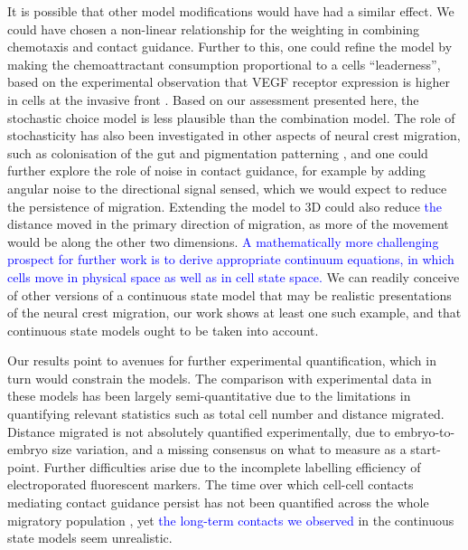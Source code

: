 \documentclass[review]{elsarticle}
\newcommand\hl[1]{{\textcolor{blue}{#1}}}
\begin{document}

It is possible that other model modifications would have had a similar effect. We could have chosen a non-linear relationship for the weighting in combining chemotaxis and contact guidance. Further to this, one could refine the model by making the chemoattractant consumption proportional to a cells ``leaderness'', based on the experimental observation that VEGF receptor expression is higher in cells at the invasive front \cite{McLennan2015,Morrison2017}. Based on our assessment presented here, the stochastic choice model is less plausible than the combination model. The role of stochasticity has also been investigated in other aspects of neural crest migration, such as colonisation of the gut \cite{Binder2015,Smadbeck2015,Zhang2018} and pigmentation patterning \cite{Mort2016}, and one could further explore the role of noise in contact guidance, for example by adding angular noise to the directional signal sensed, which we would expect to reduce the persistence of migration. Extending the model to 3D could also reduce \hl{the} distance moved in the primary direction of migration, as more of the movement would be along the other two dimensions. \hl{A mathematically more challenging prospect for further work is to derive appropriate continuum equations, in which cells move in physical space as well as in cell state space.} We can readily conceive of other versions of a continuous state model that may be realistic presentations of the neural crest migration, our work shows at least one such example, and that continuous state models ought to be taken into account.

Our results point to avenues for further experimental quantification, which in turn would constrain the models. The comparison with experimental data in these models has been largely semi-quantitative due to the limitations in quantifying relevant statistics such as total cell number and distance migrated. Distance migrated is not absolutely quantified experimentally, due to embryo-to-embryo size variation, and a missing consensus on what to measure as a start-point. Further difficulties arise due to the incomplete labelling efficiency of electroporated fluorescent markers. The time over which cell-cell contacts mediating contact guidance persist has not been quantified across the whole migratory population \cite{Teddy2004}, yet \hl{the long-term contacts we observed} in the continuous state models seem unrealistic. %
\end{document}
